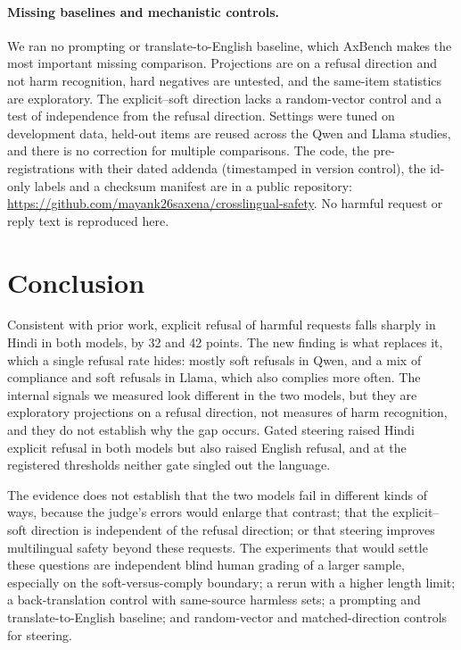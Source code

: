 \documentclass[11pt]{article}
\begin{document}
\paragraph{Missing baselines and mechanistic controls.} We ran no prompting or translate-to-English baseline, which AxBench makes the most important missing comparison. Projections are on a refusal direction and not harm recognition, hard negatives are untested, and the same-item statistics are exploratory. The explicit--soft direction lacks a random-vector control and a test of independence from the refusal direction. Settings were tuned on development data, held-out items are reused across the Qwen and Llama studies, and there is no correction for multiple comparisons. The code, the pre-registrations with their dated addenda (timestamped in version control), the id-only labels and a checksum manifest are in a public repository: \url{https://github.com/mayank26saxena/crosslingual-safety}. No harmful request or reply text is reproduced here.

\section{Conclusion}
Consistent with prior work, explicit refusal of harmful requests falls sharply in Hindi in both models, by 32 and 42 points. The new finding is what replaces it, which a single refusal rate hides: mostly soft refusals in Qwen, and a mix of compliance and soft refusals in Llama, which also complies more often. The internal signals we measured look different in the two models, but they are exploratory projections on a refusal direction, not measures of harm recognition, and they do not establish why the gap occurs. Gated steering raised Hindi explicit refusal in both models but also raised English refusal, and at the registered thresholds neither gate singled out the language.

The evidence does not establish that the two models fail in different kinds of ways, because the judge's errors would enlarge that contrast; that the explicit--soft direction is independent of the refusal direction; or that steering improves multilingual safety beyond these requests. The experiments that would settle these questions are independent blind human grading of a larger sample, especially on the soft-versus-comply boundary; a rerun with a higher length limit; a back-translation control with same-source harmless sets; a prompting and translate-to-English baseline; and random-vector and matched-direction controls for steering.
\end{document}
